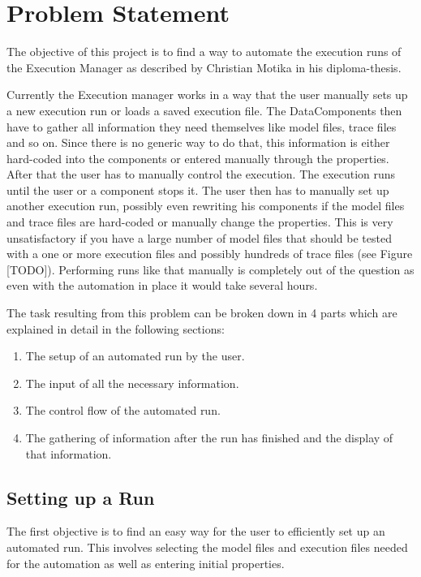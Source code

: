\chapter{Problem Statement}
\label{chapter:AutoTask}
The objective of this project is to find a way to automate the execution
runs of the Execution Manager as described by Christian Motika in his
diploma-thesis\cite{cmot-dt}.

Currently the Execution manager works in a way that the user manually sets up
a new execution run or loads a saved execution file. The DataComponents then have 
to gather all information they need themselves like model files, trace files and so on.
Since there is no generic way to do that, this information is either hard-coded into
the components or entered manually through the properties.
After that the user has to manually control the execution. The execution runs until
the user or a component stops it. The user then has to manually set up another
execution run, possibly even rewriting his components if the model files
and trace files are hard-coded or manually change the properties.
This is very unsatisfactory if you have a large number of model files that
should be tested with a one or more execution files and possibly hundreds of trace files
(see Figure [TODO]).
Performing runs like that manually is completely out of the question as even
with the automation in place it would take several hours.

The task resulting from this problem can be broken down in 4 parts which are explained in detail in
the following sections:
\begin{enumerate}
 \item The setup of an automated run by the user.
 \item The input of all the necessary information.
 \item The control flow of the automated run.
 \item The gathering of information after the run has finished and the display 
of that information.
\end{enumerate}

\section{Setting up a Run}
\label{section:AutoTaskSetup}
The first objective is to find an easy way for the user to efficiently set up an
automated run. This involves selecting the model files and execution files
needed for the automation as well as entering initial properties.

